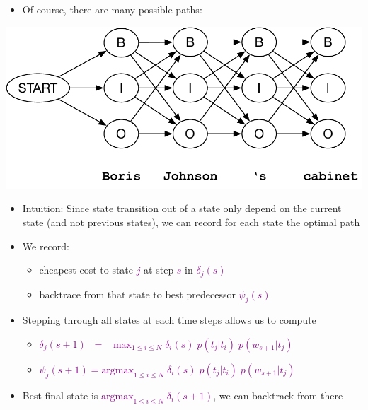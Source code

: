 \documentclass[landscape]{jhuslides3C}
\newcommand{\maths}[1]{\textcolor{purple}{#1}}
\begin{document}
\vfill
\begin{itemize}
\item Of course, there are many possible paths:
\end{itemize}
\vfill
\begin{center}
\includegraphics[scale=1.2]{hmm-search-ne3.pdf}
\end{center}
\vfill


\vfill
\begin{itemize}
\item Intuition: Since state transition out of a state only depend on the current state (and not previous states), we can record for each state the optimal path\pause
\item We record:
\begin{itemize}
\item cheapest cost to state \maths{$j$} at step \maths{$s$} in \maths{$\delta_j(s)$}
\item backtrace from that state to best predecessor \maths{$\psi_j(s)$}\pause
\end{itemize}
\item Stepping through all states at each time steps allows us to compute
\begin{itemize}
\item \maths{$\delta_j(s+1) \; \; = \; \; \; \mbox{max}_{1 \le i \le N} \; \delta_i(s) \; p(t_j|t_i)\; p(w_{s+1}|t_j)$}
\item \maths{$\psi_j(s+1) = \mbox{argmax}_{1 \le i \le N} \; \delta_i(s) \; p(t_j|t_i)\; p(w_{s+1}|t_j)$}\pause
\end{itemize}
\item Best final state is \maths{$\mbox{argmax}_{1 \le i \le N} \; \delta_i(s+1)$}, we can backtrack from there
\end{itemize}
\vfill
\end{document}
